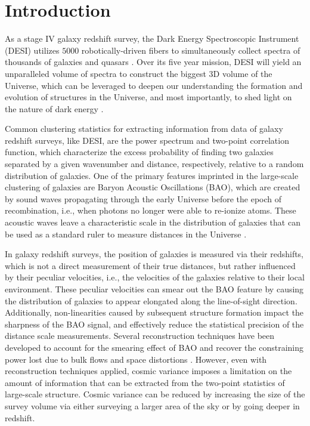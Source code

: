 \section{Introduction}
\label{sec:introduction}
As a stage IV galaxy redshift survey, the Dark Energy Spectroscopic Instrument (DESI) utilizes $5000$ robotically-driven fibers to simultaneously collect spectra of thousands of galaxies and quasars \citep{aghamousa2016desi}. Over its five year mission, DESI will yield an unparalleled volume of spectra to construct the biggest 3D volume of the Universe, which can be leveraged to deepen our understanding the formation and evolution of structures in the Universe, and most importantly, to shed light on the nature of dark energy \citep{2016arXiv161100036D}.

Common clustering statistics for extracting information from data of galaxy redshift surveys, like DESI, are the power spectrum and two-point correlation function, which characterize the excess probability of finding two galaxies separated by a given wavenumber and distance, respectively, relative to a random distribution of galaxies. One of the primary features imprinted in the large-scale clustering of galaxies are Baryon Acoustic Oscillations (BAO), which are created by sound waves propagating through the early Universe before the epoch of recombination, i.e., when photons no longer were able to re-ionize atoms. These acoustic waves leave a characteristic scale in the distribution of galaxies that can be used as a standard ruler to measure distances in the Universe \citep[see, e.g.,][]{1996ApJ...471..542H, 1998ApJ...496..605E, 2003ApJ...598..720S}.
 
In galaxy redshift surveys, the position of galaxies is measured via their redshifts, which is not a direct measurement of their true distances, but rather influenced by their peculiar velocities, i.e., the velocities of the galaxies relative to their local environment. These peculiar velocities can smear out the BAO feature by causing the distribution of galaxies to appear elongated along the line-of-sight direction. Additionally, non-linearities caused by subsequent structure formation impact the sharpness of the BAO signal, and effectively reduce the statistical precision of the distance scale measurements. Several reconstruction techniques have been developed to account for the smearing effect of BAO and recover the constraining power lost due to bulk flows and space distortions \citep[see, e.g.,][]{Eisenstein_2007}. However, even with reconstruction techniques applied, cosmic variance imposes a limitation on the amount of information that can be extracted from the two-point statistics of large-scale structure. Cosmic variance can be reduced by increasing the size of the survey volume via either surveying a larger area of the sky or by going deeper in redshift. 

